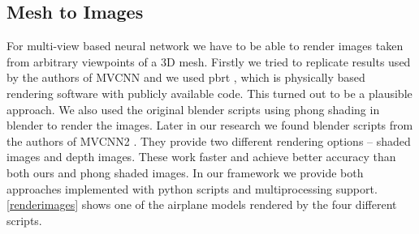 \subsection{Mesh to Images}
For multi-view based neural network we have to be able to render images taken from arbitrary viewpoints of a 3D mesh. Firstly we tried to replicate results used by the authors of MVCNN \cite{su_multi-view_2015} and we used pbrt \cite{pharr_physically_2010}, which is physically based rendering software with publicly available code. This turned out to be a plausible approach. We also used the original blender scripts using phong shading \cite{bishop_fast_1986} in blender to render the images.
Later in our research we found blender scripts from the authors of MVCNN2 \cite{su_deeper_2018}. They provide two different rendering options -- shaded images and depth images. These work faster and achieve better accuracy than both ours and phong shaded images. In our framework we provide both approaches implemented with python scripts and multiprocessing support. \autoref{renderimages} shows one of the airplane models rendered by the four different scripts.


